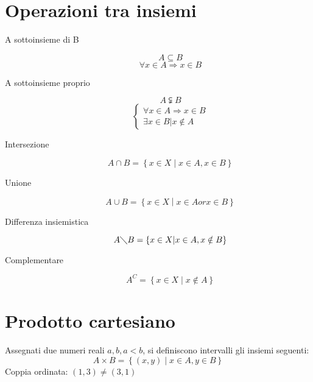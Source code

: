 \section{Operazioni tra insiemi}
\begin{description}
  \item[A sottoinsieme di B]
    \[A \subseteq  B\]
    \[\forall x \in A \Rightarrow x \in B\]
  \item[A sottoinsieme proprio]
    \[A \subsetneqq  B\]
    \[
      \begin{cases}
        \forall x \in A \Rightarrow x \in B \\
        \exists x \in B | x \notin A
        \end{cases}
      \]
    \item[Intersezione]
      \[A \cap B = \left\{ x \in X \middle| x \in A, x \in B\right\}\]
    \item[Unione]
      \[A \cup B = \left\{ x \in X \middle| x \in A or x \in B\right\}\]
    \item[Differenza insiemistica]
      \[A \diagdown B = \left\{ x \in X \middle| x \in A, x \notin B\right\}\]
    \item[Complementare]
      \[A^C = \left\{ x \in X \middle| x \notin A \right\}\]
\end{description}

\section{Prodotto cartesiano}
Assegnati due numeri reali $a, b, a < b$, si definiscono intervalli gli insiemi seguenti:
\[A\times B = \left\{ (x,y) \middle| x\in A, y\in B\right\}\]
Coppia ordinata: $(1,3) \neq (3,1)$


